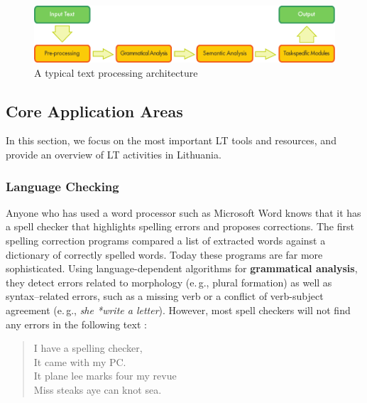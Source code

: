 \documentclass[]{../metanetpaper}
\begin{document}
\begin{multicols}{2}
\begin{figure}[htb]
  \center
  \includegraphics[width=\textwidth]{../_media/english/text_processing_app_architecture}
  \caption{A typical text processing architecture}
  \label{fig:textprocessingarch_en}
\end{figure}

\subsection{Core Application Areas}

In this section, we focus on the most important LT tools and resources, and provide an overview of LT activities in Lithuania. 

\subsubsection{Language Checking}

Anyone who has used a word processor such as Microsoft Word knows that it has a spell checker that highlights spelling errors and proposes corrections. The first spelling correction programs compared a list of extracted words against a dictionary of correctly spelled words. Today these programs are far more sophisticated. Using language-dependent algorithms for \textbf{grammatical analysis}, they detect errors related to morphology (e.\,g., plural formation) as well as syntax–related errors, such as a missing verb or a conflict of verb-subject agreement (e.\,g., \textit{she *write a letter}). However, most spell checkers will not find any errors in the following text \cite{zar1}:

\begin{quote}
  I have a spelling checker,\\
  It came with my PC.\\
  It plane lee marks four my revue\\
  Miss steaks aye can knot sea.
\end{quote}



\end{multicols}
\end{document}
